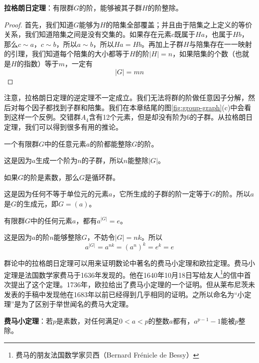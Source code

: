 \documentclass[b5paper]{ctexart}
\begin{document}
\begin{theorem}
\textbf{拉格朗日定理}：有限群$G$的阶，能够被其子群$H$的阶整除。
\end{theorem}

\begin{proof}
首先，我们知道$G$能够为$H$的陪集全部覆盖；并且由于陪集之上定义的等价关系，我们知道陪集之间是没有交集的。如果存在元素$c$既属于$Ha$，也属于$Hb$，那么$c \sim a$，$c \sim b$，所以$a \sim b$，所以$Ha = Hb$。再加上子群$H$与陪集存在一一映射的引理，我们知道每个陪集的大小都等于$H$的阶$|H|=n$，如果陪集的个数（也就是$H$的指数）等于$m$，一定有
\[
|G| = mn
\]
\end{proof}

注意，拉格朗日定理的逆定理不一定成立。我们无法将群的阶做任意因子分解，然后对每个因子都找到子群和陪集。我们在本章结尾的图\ref{fig:group-graph}(c)中会看到这样一个反例。交错群$A_4$含有12个元素，但是却没有阶为6的子群。从拉格朗日定理，我们可以得到很多有用的推论。

\begin{corollary}
一个有限群$G$中的任意元素$a$的阶都能整除$G$的阶。
\end{corollary}

这是因为$a$生成一个阶为$n$的子群，所以$n$能整除$|G|$。

\begin{corollary}
如果$G$的阶是素数，那么$G$是循环群。
\end{corollary}

这是因为任何不等于单位元的元素$a$，它所生成的子群的阶一定等于$G$的阶。所以$a$是$G$的生成元，即$G = (a)$。

\begin{corollary}
有限群$G$中的任何元素$a$，都有$a^{|G|} = e$。
\label{corollary:Lagrange-elem-order}
\end{corollary}

这是因为$a$的阶$n$能够整除$G$，不妨令$|G| = nk$。所以
\[
a^{|G|} = a^{nk} = (a^n)^k = e^k = e
\]

群论中的拉格朗日定理可以用来证明数论中著名的费马小定理和欧拉定理。费马小定理是法国数学家费马于1636年发现的。他在1640年10月18日写给友人\footnote{费马的朋友法国数学家贝西（Bernard Frénicle de Bessy）}的信中首次提出了这个定理。1736年，欧拉给出了费马小定理的一个证明。但从莱布尼茨未发表的手稿中发现他在1683年以前已经得到几乎相同的证明。之所以命名为“小定理”是为了区别于举世闻名的费马大定理。

\begin{theorem}
\textbf{费马小定理}：若$p$是素数，对任何满足$0 < a < p$的整数$a$都有，$a^{p-1}-1$能被$p$整除。
\end{theorem}
\end{document}
